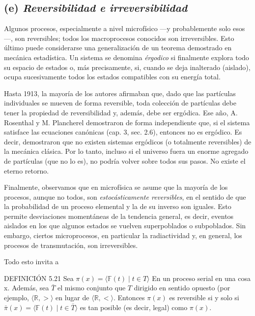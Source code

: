 \begin{justifying}
    \subsection*{(e)\textit{ Reversibilidad e irreversibilidad}}
    \noindent Algunos procesos, especialmente a nivel microfísico —y probablemente solo esos—, son reversibles; todos los macroprocesos conocidos son irreversibles.
    Esto último puede considerarse una generalización de un teorema demostrado en mecánica estadística. Un sistema se denomina {\textit{érgodico}} si finalmente explora todo su espacio de estados o, 
    más precisamente, si, cuando se deja inalterado (aislado), ocupa sucesivamente todos los estados compatibles con su energía total.

    \smallskip

    \noindent Hasta 1913, la mayoría de los autores afirmaban que, dado que las partículas individuales se mueven
    de forma reversible, toda colección de partículas debe tener la propiedad de reversibilidad y, además, debe ser ergódica. 
    Ese año, A. Rosenthal y M. Plancherel demostraron de forma independiente que, si el sistema satisface las ecuaciones canónicas (cap. 3, sec. 2.6), entonces no es ergódico. 
    Es decir, demostraron que no existen sistemas ergódicos (o totalmente reversibles) de la mecánica clásica. 
    Por lo tanto, incluso si el universo fuera un enorme agregado de partículas (que no lo es), no podría volver sobre todos sus pasos. 
    No existe el eterno retorno.

    Finalmente, observamos que en microfísica se asume que la mayoría de los procesos, aunque no todos, son {\textit{estocásticamente reversibles}}, 
    en el sentido de que la probabilidad de un proceso elemental y la de su inverso son iguales. Esto permite desviaciones momentáneas de la tendencia general, 
    es decir, eventos aislados en los que algunos estados se vuelven superpoblados o subpoblados. Sin embargo, ciertos microprocesos, en particular la radiactividad y, 
    en general, los procesos de transmutación, son irreversibles.

    Todo esto invita a

    \smallskip

    \noindent DEFINICIÓN 5.21 Sea $\pi(x) = \langle \mathbb{F}(t) \mid t \in T \rangle$ En un proceso serial en una cosa x.
    Además, sea $\bar{T}$ el mismo conjunto que $T$ dirigido en sentido opuesto (por ejemplo, $\langle \mathbb{R}, > \rangle$  en lugar de $\langle \mathbb{R}, < \rangle$. 
    Entonces $\pi(x)$ es reversible si y solo si $\bar{\pi}(x) = \langle \mathbb{F}(t) \mid t \in \bar{T} \rangle$ es tan posible (es decir, legal) como $\pi(x)$.


\end{justifying}
